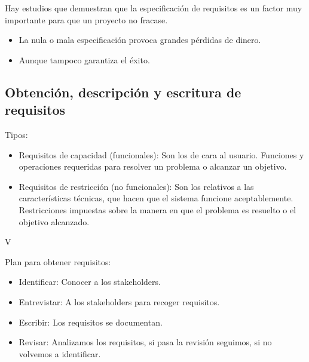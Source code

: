 \documentclass[12pt, twoside, openright]{report} %
\begin{document}
Hay estudios que demuestran que la especificación de requisitos es
un factor muy importante para que un proyecto no fracase.

\begin{itemize}
	\item La nula o mala especificación provoca grandes pérdidas de dinero.
	\item Aunque tampoco garantiza el éxito.
\end{itemize}

\subsection{Obtención, descripción y escritura de requisitos}

Tipos:
\begin{itemize}
	\item Requisitos de capacidad (funcionales): Son los de cara al usuario.
	      Funciones y operaciones requeridas para resolver un problema o
	      alcanzar un objetivo.
	\item Requisitos de restricción (no funcionales): Son los relativos a
	      las características técnicas, que hacen que el sistema funcione
	      aceptablemente. Restricciones impuestas sobre la manera en que el
	      problema es resuelto o el objetivo alcanzado.
\end{itemize}

V
\begin{figure}[H]
	{\def\svgwidth{.8\textwidth}
		}
\end{figure}

Plan para obtener requisitos:
\begin{itemize}
	\item Identificar: Conocer a los stakeholders.
	\item Entrevistar: A los stakeholders para recoger requisitos.
	\item Escribir: Los requisitos se documentan.
	\item Revisar: Analizamos los requisitos, si pasa la revisión seguimos,
	      si no volvemos a identificar.
\end{itemize}
\end{document}
